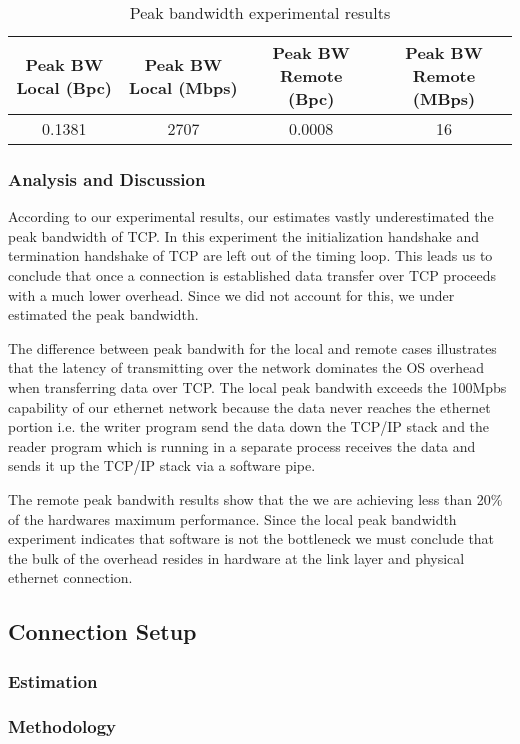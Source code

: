 \begin{table*}[b]
\begin{tabular}{|c|c|c|c|}
\hline
Peak BW Local (Bpc) & Peak BW Local (Mbps) & Peak BW Remote (Bpc) & Peak BW Remote (MBps) \\ \hline
0.1381            & 2707          & 0.0008            & 16          \\ \hline
\end{tabular}
\caption{Peak bandwidth experimental results}
\label{table:peak-results}
\end{table*}

\subsubsection{Analysis and Discussion}
According to our experimental results, our estimates vastly underestimated the peak bandwidth of TCP.
In this experiment the initialization handshake and termination handshake of TCP are left out of the timing loop. This leads us to conclude that once a connection is established data transfer over TCP 
proceeds with a much lower overhead. Since we did not account for this, we under estimated the peak
bandwidth.

The difference between peak bandwith for the local and remote cases illustrates that the latency of 
transmitting over the network dominates the OS overhead when transferring data over TCP. The local 
peak bandwith exceeds the 100Mpbs capability of our ethernet network because the data never reaches
the ethernet portion i.e. the writer program send the data down the TCP/IP stack and the reader 
program which is running in a separate process receives the data and sends it up the TCP/IP stack via
 a software pipe. 

The remote peak bandwith results show that the we are achieving less than 20\% of the hardwares 
maximum performance. Since the local peak bandwidth experiment indicates that software is not the 
bottleneck we must conclude that the bulk of the overhead resides in hardware at the link layer and
physical ethernet connection. 

\subsection{Connection Setup}
\subsubsection{Estimation}
\subsubsection{Methodology}
